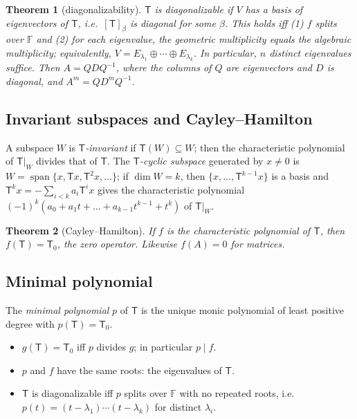 \documentclass[12pt]{article}
\newtheorem{theorem}{Theorem}[section]
\theoremstyle{definition}
\theoremstyle{remark}
\newcommand{\F}{\mathbb{F}}
\newcommand{\T}{\mathsf{T}}
\DeclareMathOperator{\spn}{span}
\begin{document}
\begin{theorem}[diagonalizability]
$\T$ is \emph{diagonalizable} if $V$ has a basis of eigenvectors of $\T$, i.e.\ $[\T]_\beta$ is diagonal for some $\beta$.
This holds iff (1) $f$ splits over $\F$ and (2) for each eigenvalue, the geometric multiplicity equals the algebraic multiplicity;
equivalently, $V=E_{\lambda_1}\oplus\cdots\oplus E_{\lambda_k}$. In particular, $n$ distinct eigenvalues suffice.
Then $A=QDQ^{-1}$, where the columns of $Q$ are eigenvectors and $D$ is diagonal, and $A^m=QD^mQ^{-1}$.
\end{theorem}

\subsection{Invariant subspaces and Cayley–Hamilton}
A subspace $W$ is \emph{$\T$-invariant} if $\T(W)\subseteq W$; then the characteristic polynomial of $\T|_W$ divides that of $\T$.
The \emph{$\T$-cyclic subspace} generated by $x\neq0$ is $W=\spn\{x,\T x,\T^2x,\dots\}$; if $\dim W=k$, then $\{x,\dots,\T^{k-1}x\}$ is a basis and
$\T^kx=-\sum_{i<k}a_i\T^ix$ gives the characteristic polynomial $(-1)^k(a_0+a_1t+\dots+a_{k-1}t^{k-1}+t^k)$ of $\T|_W$.

\begin{theorem}[Cayley–Hamilton]
If $f$ is the characteristic polynomial of $\T$, then $f(\T)=\mathsf{T}_0$, the zero operator. Likewise $f(A)=0$ for matrices.
\end{theorem}

\subsection{Minimal polynomial}
The \emph{minimal polynomial} $p$ of $\T$ is the unique monic polynomial of least positive degree with $p(\T)=\mathsf{T}_0$.
\begin{itemize}
  \item $g(\T)=\mathsf{T}_0$ iff $p$ divides $g$; in particular $p\mid f$.
  \item $p$ and $f$ have the same roots: the eigenvalues of $\T$.
  \item $\T$ is diagonalizable iff $p$ splits over $\F$ with no repeated roots, i.e.\ $p(t)=(t-\lambda_1)\cdots(t-\lambda_k)$ for distinct $\lambda_i$.
\end{itemize}
\end{document}
